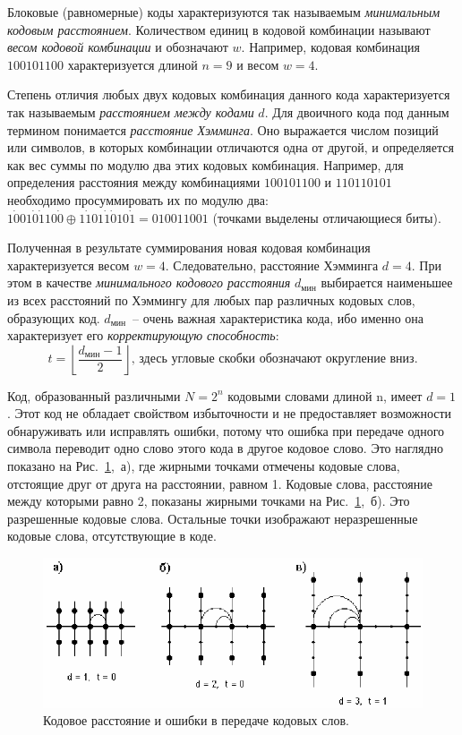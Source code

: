 \documentclass[12pt,a4paper]{article}
\begin{document}
  Блоковые (равномерные) коды характеризуются так называемым \emph{минимальным кодовым расстоянием}. Количеством единиц в кодовой комбинации называют \emph{весом кодовой комбинации} и обозначают $w$. Например, кодовая комбинация $100101100$ характеризуется длиной $n=9$ и весом $w=4$.
  
  Степень отличия любых двух кодовых комбинация данного кода характеризуется так называемым \emph{расстоянием между кодами} $d$. Для двоичного кода под данным термином понимается \emph{расстояние Хэмминга}. Оно выражается числом позиций или символов, в которых  комбинации отличаются одна от другой, и определяется как вес суммы по модулю два этих кодовых комбинация. Например, для определения расстояния между комбинациями $100101100$ и $110110101$ необходимо просуммировать их по модулю два: $1\dot{0}01\dot{0}\dot{1}10\dot{0}\oplus 1\dot{1}01\dot{1}\dot{0}10\dot{1}=010011001$ (точками выделены отличающиеся биты).
  
  Полученная в результате суммирования новая кодовая комбинация характеризуется весом $w=4$. Следовательно, расстояние Хэмминга $d=4$. При этом в качестве \emph{минимального кодового расстояния} $d_\text{мин}$ выбирается наименьшее из всех расстояний по Хэммингу для любых пар различных кодовых слов, образующих код. $d_\text{мин}$~-- очень важная характеристика кода, ибо именно она характеризует его \emph{корректирующую способность}:
  \begin{equation}
    \nonumber
    t=\left\lfloor\frac{d_\text{мин}-1}{2}\right\rfloor\text{, здесь угловые скобки обозначают округление вниз.}
  \end{equation}
  
  Код, образованный различными $N=2^n$ кодовыми словами длиной n, имеет $d=1$. Этот код не обладает свойством избыточности и не предоставляет возможности обнаруживать или исправлять ошибки, потому что ошибка при передаче одного символа переводит одно слово этого кода в другое кодовое слово. Это наглядно показано на Рис.~\ref{img:t:d},~а), где жирными точками отмечены кодовые слова, отстоящие друг от друга на расстоянии, равном 1. Кодовые  слова,  расстояние  между  которыми  равно 2, показаны  жирными точками на Рис.~\ref{img:t:d},~б). Это разрешенные кодовые слова. Остальные точки изображают неразрешенные кодовые слова, отсутствующие в коде.
  \begin{figure}[H]
	  \centering
	  \includegraphics[width=\linewidth]{d}
	  \caption{Кодовое расстояние и ошибки в передаче кодовых слов.}
	  \label{img:t:d}
  \end{figure}
  
\end{document}
